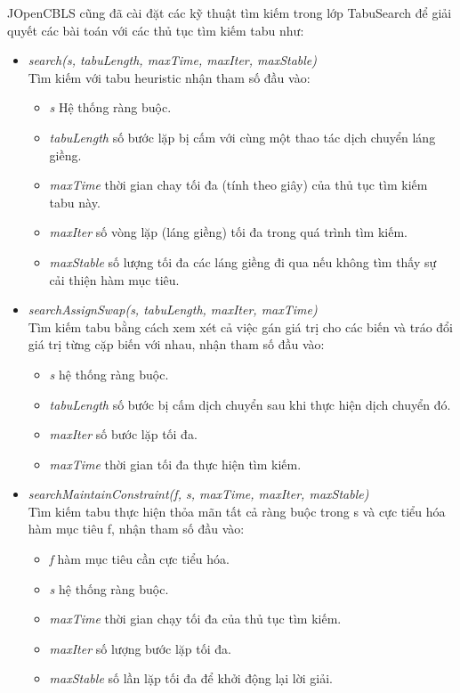 JOpenCBLS cũng đã cài đặt các kỹ thuật tìm kiếm trong lớp \textsf{TabuSearch} để giải quyết các bài toán với các thủ tục tìm kiếm tabu như:
\begin{itemize}
	\item \textit{search(s, tabuLength, maxTime, maxIter, maxStable)}\\
	Tìm kiếm với tabu heuristic nhận tham số đầu vào:
	\begin{itemize}
		\item \textit{s} Hệ thống ràng buộc.
		\item \textit{tabuLength} số bước lặp bị cấm với cùng một thao tác dịch chuyển láng giềng.
		\item \textit{maxTime} thời gian chay tối đa (tính theo giây) của thủ tục tìm kiếm tabu này.
		\item \textit{maxIter} số vòng lặp (láng giềng) tối đa trong quá trình tìm kiếm.
		\item \textit{maxStable} số lượng tối đa các láng giềng đi qua nếu không tìm thấy sự cải thiện hàm mục tiêu.
	\end{itemize}	
	\item \textit{searchAssignSwap(s, tabuLength, maxIter, maxTime)}\\
	Tìm kiếm tabu bằng cách xem xét cả việc gán giá trị cho các biến và tráo đổi giá trị từng cặp biến với nhau, nhận tham số đầu vào:
	\begin{itemize}
		\item \textit{s} hệ thống ràng buộc.
		\item \textit{tabuLength} số bước bị cấm dịch chuyển sau khi thực hiện dịch chuyển đó.
		\item \textit{maxIter} số bước lặp tối đa.
		\item \textit{maxTime} thời gian tối đa thực hiện tìm kiếm.
	\end{itemize}	
	\item \textit{searchMaintainConstraint(f, s, maxTime, maxIter, maxStable)}\\
	Tìm kiếm tabu thực hiện thỏa mãn tất cả ràng buộc trong s và cực tiểu hóa hàm mục tiêu f, nhận tham số đầu vào:
	\begin{itemize}
		\item \textit{f} hàm mục tiêu cần cực tiểu hóa.
		\item \textit{s} hệ thống ràng buộc.
		\item \textit{maxTime}  thời gian chạy tối đa của thủ tục tìm kiếm.
		\item \textit{maxIter} số lượng bước lặp tối đa.
		\item \textit{maxStable} số lần lặp tối đa để khởi động lại lời giải.
	\end{itemize}	 
\end{itemize}

